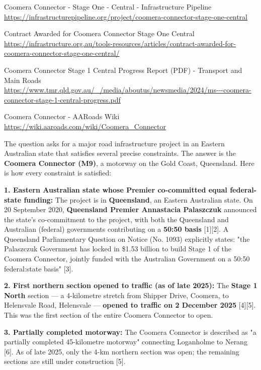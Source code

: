 \documentclass{llmxive}
\begin{document}
\begin{tcolorbox}
[11] Coomera Connector - Stage One - Central - Infrastructure Pipeline \url{https://infrastructurepipeline.org/project/coomera-connector-stage-one-central}\par
[12] Contract Awarded for Coomera Connector Stage One Central \url{https://infrastructure.org.au/tools-resources/articles/contract-awarded-for-coomera-connector-stage-one-central/}\par
[13] Coomera Connector Stage 1 Central Progress Report (PDF) - Transport and Main Roads \url{https://www.tmr.qld.gov.au/_/media/aboutus/newsmedia/2024/ms---coomera-connector-stage-1-central-progress.pdf}\par
[14] Coomera Connector - AARoads Wiki \url{https://wiki.aaroads.com/wiki/Coomera_Connector}
\end{tcolorbox}

\begin{tcolorbox}[breakable,enhanced jigsaw,colback=yellow!16,colframe=yellow!55,boxrule=0.4pt,left=5pt,right=5pt,top=3pt,bottom=3pt,fonttitle=\bfseries\sffamily\small,coltitle=black,fontupper=\small,title={Final explanation delivered to the user}]
The question asks for a major road infrastructure project in an Eastern Australian state that satisfies several precise constraints. The answer is the \textbf{Coomera Connector (M9)}, a motorway on the Gold Coast, Queensland. Here is how every constraint is satisfied:

\textbf{1. Eastern Australian state whose Premier co-committed equal federal-state funding:} The project is in \textbf{Queensland}, an Eastern Australian state. On 20 September 2020, \textbf{Queensland Premier Annastacia Palaszczuk} announced the state's co-commitment to the project, with both the Queensland and Australian (federal) governments contributing on a \textbf{50:50 basis} [1][2]. A Queensland Parliamentary Question on Notice (No. 1093) explicitly states: "the Palaszczuk Government has locked in \$1.53 billion to build Stage 1 of the Coomera Connector, jointly funded with the Australian Government on a 50:50 federal:state basis" [3].

\textbf{2. First northern section opened to traffic (as of late 2025):} The \textbf{Stage 1 North} section --- a 4-kilometre stretch from Shipper Drive, Coomera, to Helensvale Road, Helensvale --- \textbf{opened to traffic on 2 December 2025} [4][5]. This was the first section of the entire Coomera Connector to open.

\textbf{3. Partially completed motorway:} The Coomera Connector is described as "a partially completed 45-kilometre motorway" connecting Loganholme to Nerang [6]. As of late 2025, only the 4-km northern section was open; the remaining sections are still under construction [5].


\end{tcolorbox}
\end{document}
